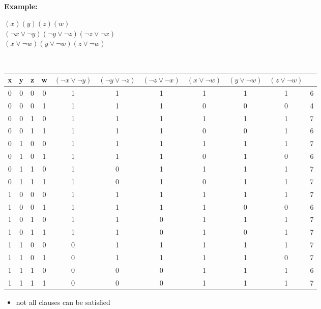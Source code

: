 \documentclass[a4]{scrartcl}
\begin{document}
\ \\
\textbf{Example:}
\begin{center}
$(x)(y)(z)(w)$\\
$(\neg x \lor \neg y)(\neg y \lor \neg z)(\neg z \lor \neg x)$ \\
$(x \lor \neg w)(y \lor \neg w)(z \lor \neg w)$

\ \\

\begin{small}
\begin{tabular}{|c |c |c |c |c |c |c |c |c |c |c|} 
\hline
 x & y & z & w & $(\neg x \lor \neg y)$ & $(\neg y \lor \neg z)$ & $(\neg z \lor \neg x)$ & $(x \lor \neg w)$ & $(y \lor \neg w)$ & $(z \lor \neg w)$ & \\
 \hline
  \hline
 0 & 0 & 0 & 0 & 1 & 1 & 1 & 1 & 1 & 1 & 6 \\ 
 0 & 0 & 0 & 1 & 1 & 1 & 1 & 0 & 0 & 0 & 4 \\
 0 & 0 & 1 & 0 & 1 & 1 & 1 & 1 & 1 & 1 & 7 \\ 
 0 & 0 & 1 & 1 & 1 & 1 & 1 & 0 & 0 & 1 & 6 \\
  \hline
 0 & 1 & 0 & 0 & 1 & 1 & 1 & 1 & 1 & 1 & 7 \\ 
 0 & 1 & 0 & 1 & 1 & 1 & 1 & 0 & 1 & 0 & 6 \\
 0 & 1 & 1 & 0 & 1 & 0 & 1 & 1 & 1 & 1 & 7 \\ 
 0 & 1 & 1 & 1 & 1 & 0 & 1 & 0 & 1 & 1 & 7 \\
  \hline
 1 & 0 & 0 & 0 & 1 & 1 & 1 & 1 & 1 & 1 & 7 \\ 
 1 & 0 & 0 & 1 & 1 & 1 & 1 & 1 & 0 & 0 & 6 \\
 1 & 0 & 1 & 0 & 1 & 1 & 0 & 1 & 1 & 1 & 7 \\
 1 & 0 & 1 & 1 & 1 & 1 & 0 & 1 & 0 & 1 & 7 \\ 
  \hline
 1 & 1 & 0 & 0 & 0 & 1 & 1 & 1 & 1 & 1 & 7 \\
 1 & 1 & 0 & 1 & 0 & 1 & 1 & 1 & 1 & 0 & 7 \\ 
 1 & 1 & 1 & 0 & 0 & 0 & 0 & 1 & 1 & 1 & 6 \\
 1 & 1 & 1 & 1 & 0 & 0 & 0 & 1 & 1 & 1 & 7 \\  
 \hline
\end{tabular}
\end{small}
\end{center}


\begin{itemize}
\item not all clauses can be satisfied
\end{itemize}
\end{document}
